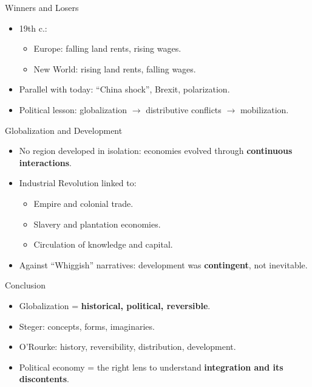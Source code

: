\documentclass[10pt]{beamer}
\begin{document}
\begin{frame}{Winners and Losers}
\begin{itemize}
    \item 19th c.:  
    \begin{itemize}
        \item Europe: falling land rents, rising wages.  
        \item New World: rising land rents, falling wages.  
    \end{itemize}
    \item Parallel with today: “China shock”, Brexit, polarization.
    \item Political lesson: globalization $\rightarrow$ distributive conflicts $\rightarrow$ 
mobilization.
\end{itemize}
\end{frame}

\begin{frame}{Globalization and Development}
\begin{itemize}
    \item No region developed in isolation: economies evolved through \textbf{continuous 
interactions}.
    \item Industrial Revolution linked to:  
    \begin{itemize}
        \item Empire and colonial trade.  
        \item Slavery and plantation economies.  
        \item Circulation of knowledge and capital.  
    \end{itemize}
    \item Against “Whiggish” narratives: development was \textbf{contingent}, not inevitable.
\end{itemize}
\end{frame}

\begin{frame}{Conclusion}
\begin{itemize}
    \item Globalization = \textbf{historical, political, reversible}.
    \item Steger: concepts, forms, imaginaries.  
    \item O’Rourke: history, reversibility, distribution, development.
    \item Political economy = the right lens to understand \textbf{integration and its 
discontents}.
\end{itemize}
\end{frame}
\end{document}
